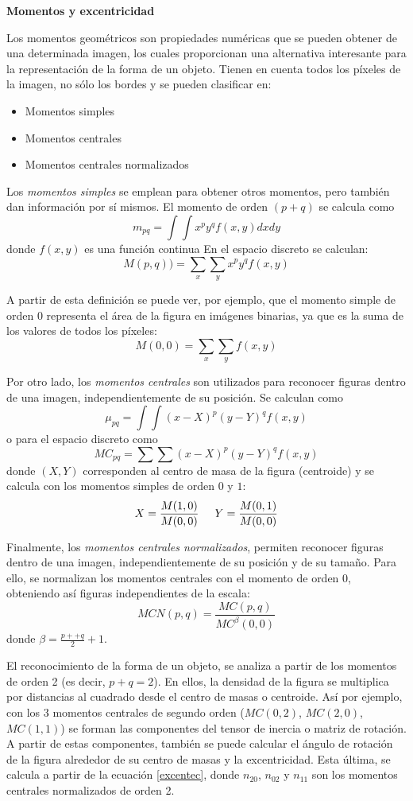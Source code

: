 \vspace{8 mm}
\textbf{Momentos y excentricidad}\cite{imageMoments}

Los momentos geométricos son propiedades numéricas que se pueden obtener de una determinada imagen, los cuales proporcionan una alternativa interesante para la representación de la forma de un objeto. Tienen en cuenta todos los píxeles de la imagen, no sólo los bordes y se pueden clasificar en:

\begin{itemize}
\item Momentos simples
\item Momentos centrales
\item Momentos centrales normalizados
\end{itemize}

Los \textit{momentos simples} se emplean para obtener otros momentos, pero también dan información por sí mismos. El momento de orden $(p+q)$ se calcula como $$m_{pq}={\int}{\int}x^py^qf(x,y)dxdy$$ donde $f(x,y)$ es una función continua En el espacio discreto se calculan: $$M(p,q))={\sum}_x{\sum}_yx^py^qf(x,y)$$

A partir de esta definición se puede ver, por ejemplo, que el momento simple de orden 0 representa el área de la figura en imágenes binarias, ya que es la suma de los valores de todos los píxeles: $$M(0,0) = {\sum}_x{\sum}_yf(x,y)$$

Por otro lado, los \textit{momentos centrales} son utilizados para reconocer figuras dentro de una imagen, independientemente de su posición. Se calculan como $${\mu}_{pq}={\int}{\int}(x-X)^p(y-Y)^qf(x,y)$$ o para el espacio discreto como $${MC}_{pq}={\sum}{\sum}(x-X)^p(y-Y)^qf(x,y)$$ donde $(X,Y)$ corresponden al centro de masa de la figura (centroide) y se calcula con los momentos simples de orden $0$ y $1$: $$X=\frac{M(1,0)}{M(0,0)} \hspace{5 mm} Y=\frac{M(0,1)}{M(0,0)}$$

Finalmente, los \textit{momentos centrales normalizados}, permiten reconocer figuras dentro de una imagen, independientemente de su posición y de su tamaño. Para ello, se normalizan los momentos centrales con el momento de orden $0$, obteniendo así figuras independientes de la escala: $$MCN(p,q) = \frac{MC(p,q)}{MC^{\beta}(0,0)}$$ donde ${\beta}=\frac{p++q}{2}+1$.

El reconocimiento de la forma de un objeto, se analiza a partir de los momentos de orden 2 (es decir, $p+q=2$). En ellos, la densidad de la figura se multiplica por distancias al cuadrado desde el centro de masas o centroide. Así por ejemplo, con los 3 momentos centrales de segundo orden ($MC(0,2)$, $MC(2,0)$, $MC(1,1)$) se forman las componentes del tensor de inercia o matriz de rotación. A partir de estas componentes, también se puede calcular el ángulo de rotación de la figura alrededor de su centro de masas y la excentricidad. Esta última, se calcula a partir de la ecuación \ref{excentec}, donde $n_{20}$, $n_{02}$ y $n_{11}$ son los momentos centrales normalizados de orden 2.


